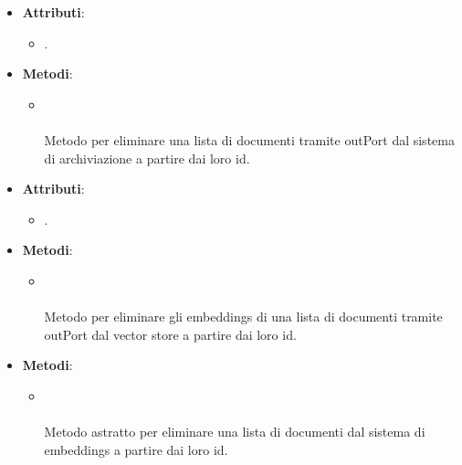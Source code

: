 \documentclass[10pt, a4paper]{article}
\begin{document}
\label{DeleteDocumentsDettaglio}
\begin{itemize}
    \item \textbf{Attributi}:
    \begin{itemize}
        \item {}. 
    \end{itemize}
    \item \textbf{Metodi}:
    \begin{itemize}
        \item {}\\ \\
        Metodo per eliminare una lista di documenti tramite outPort dal sistema di archiviazione a partire dai loro id.
    \end{itemize}
\end{itemize}

\label{DeleteDocumentsEmbeddingsDettaglio}
\begin{itemize}
    \item \textbf{Attributi}:
    \begin{itemize}
        \item {}. 
    \end{itemize}
    \item \textbf{Metodi}:
    \begin{itemize}
        \item {}\\ \\
        Metodo per eliminare gli embeddings di una lista di documenti tramite outPort dal vector store a partire dai loro id.
    \end{itemize}
\end{itemize}

\label{DeleteDocumentsPortDettaglio}
\begin{itemize}
    \item \textbf{Metodi}:
    \begin{itemize}
        \item {}\\ \\
        Metodo astratto per eliminare una lista di documenti dal sistema di embeddings a partire dai loro id.
    \end{itemize}
\end{itemize}
\end{document}
